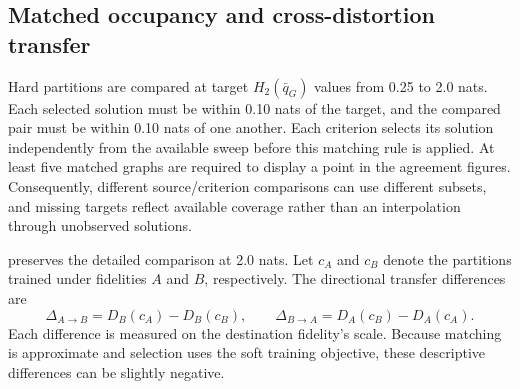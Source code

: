 \subsection{Matched occupancy and cross-distortion transfer}

Hard partitions are compared at target $H_2(\bar q_G)$ values from 0.25 to 2.0 nats.
Each selected solution must be within 0.10 nats of the target, and the compared pair must be within 0.10 nats of one another.
Each criterion selects its solution independently from the available sweep before this matching rule is applied.
At least five matched graphs are required to display a point in the agreement figures.
Consequently, different source/criterion comparisons can use different subsets, and missing targets reflect available coverage rather than an interpolation through unobserved solutions.

 preserves the detailed comparison at 2.0 nats.
Let $c_A$ and $c_B$ denote the partitions trained under fidelities $A$ and $B$, respectively.
The directional transfer differences are
\[
\Delta_{A\to B}=D_B(c_A)-D_B(c_B),
\qquad
\Delta_{B\to A}=D_A(c_B)-D_A(c_A).
\]
Each difference is measured on the destination fidelity's scale.
Because matching is approximate and selection uses the soft training objective, these descriptive differences can be slightly negative.

